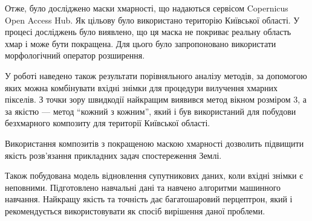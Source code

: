 Отже, було досліджено маски хмарності, що надаються сервісом Copernicus
Open Access Hub. Як цільову було використано територію Київської
області. У процесі досліджень було виявлено, що ця маска не покриває
реальну область хмар і може бути покращена. Для цього було запропоновано
використати морфологічний оператор розширення.

У роботі наведено також результати порівняльного аналізу методів, за
допомогою яких можна комбінувати вхідні знімки для процедури вилучення
хмарних пікселів. З точки зору швидкодії найкращим виявився метод вікном
розміром 3, а за якістю --- метод ``кожний з кожним'', який і був використаний
для побудови безхмарного композиту для території Київської області. 

Використання композитів з покращеною маскою хмарності дозволить
підвищити якість розв’язання прикладних задач спостереження Землі.

Також побудована модель відновлення супутникових даних, коли вхідні
знімки є неповними. Підготовлено навчальні дані та навчено алгоритми
машинного навчання. Найкращу якість та точність дає багатошаровий
перцептрон, який і рекомендується використовувати як спосіб вирішення
даної проблеми.
